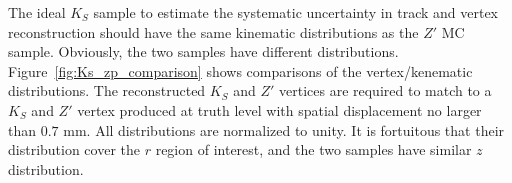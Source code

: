 The ideal $K_{S}$ sample to estimate the systematic uncertainty in track and vertex reconstruction should have the same kinematic distributions as the $Z'$ MC sample. Obviously, the two samples have different distributions. Figure~\ref{fig:Ks_zp_comparison} shows comparisons of the vertex/kenematic distributions. The reconstructed $K_{S}$ and $Z'$ vertices are required to match to a $K_{S}$ and $Z'$ vertex produced at truth level with spatial displacement no larger than $0.7$ mm. All distributions are normalized to unity. It is fortuitous that their distribution cover the $r$ region of interest, and the two samples have similar $z$ distribution.


\begin{figure}[!htb]
    \centering
     \\
     \\

\end{figure}
